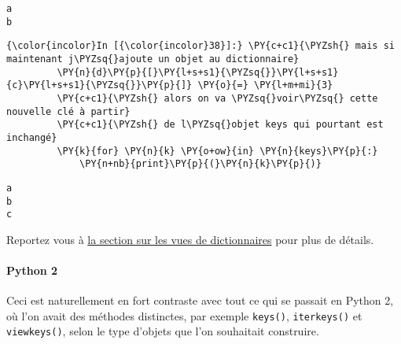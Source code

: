     \begin{Verbatim}[commandchars=\\\{\},frame=single,framerule=0.3mm,rulecolor=\color{cellframecolor}]
a
b
\end{Verbatim}

    \begin{Verbatim}[commandchars=\\\{\},frame=single,framerule=0.3mm,rulecolor=\color{cellframecolor}]
{\color{incolor}In [{\color{incolor}38}]:} \PY{c+c1}{\PYZsh{} mais si maintenant j\PYZsq{}ajoute un objet au dictionnaire}
         \PY{n}{d}\PY{p}{[}\PY{l+s+s1}{\PYZsq{}}\PY{l+s+s1}{c}\PY{l+s+s1}{\PYZsq{}}\PY{p}{]} \PY{o}{=} \PY{l+m+mi}{3}
         \PY{c+c1}{\PYZsh{} alors on va \PYZsq{}voir\PYZsq{} cette nouvelle clé à partir}
         \PY{c+c1}{\PYZsh{} de l\PYZsq{}objet keys qui pourtant est inchangé}
         \PY{k}{for} \PY{n}{k} \PY{o+ow}{in} \PY{n}{keys}\PY{p}{:}
             \PY{n+nb}{print}\PY{p}{(}\PY{n}{k}\PY{p}{)}
\end{Verbatim}


    \begin{Verbatim}[commandchars=\\\{\},frame=single,framerule=0.3mm,rulecolor=\color{cellframecolor}]
a
b
c
\end{Verbatim}

    Reportez vous à
\href{https://docs.python.org/3/library/stdtypes.html\#dictionary-view-objects}{la
section sur les vues de dictionnaires} pour plus de détails.

    \hypertarget{python-2}{%
\paragraph{Python 2}\label{python-2}}

    Ceci est naturellement en fort contraste avec tout ce qui se passait en
Python 2, où l'on avait des méthodes distinctes, par exemple
\texttt{keys()}, \texttt{iterkeys()} et \texttt{viewkeys()}, selon le
type d'objets que l'on souhaitait construire.


    
    
    
